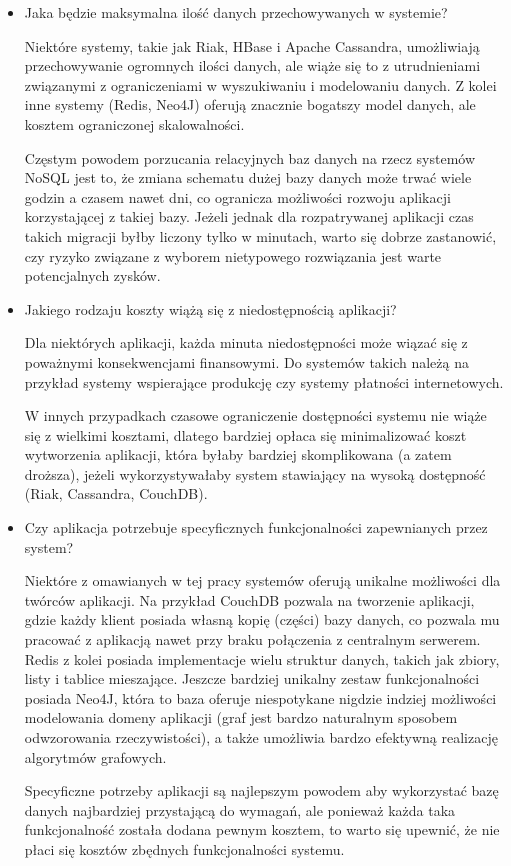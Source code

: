 \begin{itemize}
 
 \item Jaka będzie maksymalna ilość danych przechowywanych w systemie?

 Niektóre systemy, takie jak Riak, HBase i Apache Cassandra, umożliwiają przechowywanie ogromnych ilości danych, ale wiąże się to z utrudnieniami związanymi z ograniczeniami w wyszukiwaniu i modelowaniu danych.
 Z kolei inne systemy (Redis, Neo4J) oferują znacznie bogatszy model danych, ale kosztem ograniczonej skalowalności.

 Częstym powodem porzucania relacyjnych baz danych na rzecz systemów NoSQL jest to, że zmiana schematu dużej bazy danych może trwać wiele godzin a czasem nawet dni, co ogranicza możliwości rozwoju aplikacji korzystającej z takiej bazy.
 Jeżeli jednak dla rozpatrywanej aplikacji czas takich migracji byłby liczony tylko w minutach, warto się dobrze zastanowić, czy ryzyko związane z wyborem nietypowego rozwiązania jest warte potencjalnych zysków.

 \item Jakiego rodzaju koszty wiążą się z niedostępnością aplikacji?

 Dla niektórych aplikacji, każda minuta niedostępności może wiązać się z poważnymi konsekwencjami finansowymi.
 Do systemów takich należą na przykład systemy wspierające produkcję czy systemy płatności internetowych.

 W innych przypadkach czasowe ograniczenie dostępności systemu nie wiąże się z wielkimi kosztami, dlatego bardziej opłaca się minimalizować koszt wytworzenia aplikacji, która byłaby bardziej skomplikowana (a zatem droższa), jeżeli wykorzystywałaby system stawiający na wysoką dostępność (Riak, Cassandra, CouchDB).

 \item Czy aplikacja potrzebuje specyficznych funkcjonalności zapewnianych przez system?

 Niektóre z omawianych w tej pracy systemów oferują unikalne możliwości dla twórców aplikacji.
 Na przykład CouchDB pozwala na tworzenie aplikacji, gdzie każdy klient posiada własną kopię (części) bazy danych, co pozwala mu pracować z aplikacją nawet przy braku połączenia z centralnym serwerem.
 Redis z kolei posiada implementacje wielu struktur danych, takich jak zbiory, listy i tablice mieszające.
 Jeszcze bardziej unikalny zestaw funkcjonalności posiada Neo4J, która to baza oferuje niespotykane nigdzie indziej możliwości modelowania domeny aplikacji (graf jest bardzo naturalnym sposobem odwzorowania rzeczywistości), a także umożliwia bardzo efektywną realizację algorytmów grafowych.

 Specyficzne potrzeby aplikacji są najlepszym powodem aby wykorzystać bazę danych najbardziej przystającą do wymagań, ale ponieważ każda taka funkcjonalność została dodana pewnym kosztem, to warto się upewnić, że nie płaci się kosztów zbędnych funkcjonalności systemu.

\end{itemize}

